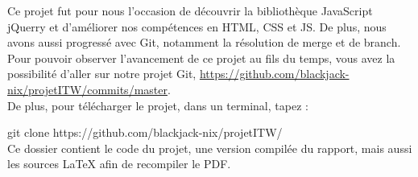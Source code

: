 Ce projet fut pour nous l'occasion de découvrir la bibliothèque JavaScript jQuerry et d'améliorer nos compétences en HTML, CSS et JS. De plus, nous avons aussi progressé avec Git, notamment la résolution de merge et de branch. \\



Pour pouvoir observer l'avancement de ce projet au fils du temps, vous avez la possibilité d'aller sur notre projet Git, \url{https://github.com/blackjack-nix/projetITW/commits/master}. \\
De plus, pour télécharger le projet, dans un terminal, tapez : 

git clone https://github.com/blackjack-nix/projetITW/ \\
Ce dossier contient le code du projet, une version compilée du rapport, mais aussi les sources LaTeX afin de recompiler le PDF.